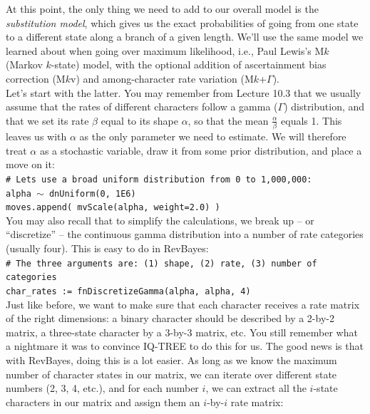 \documentclass[12pt]{article}
\begin{document}
\vspace*{1.8ex}

\noindent At this point, the only thing we need to add to our overall model is the \textit{substitution model}, which gives us the exact probabilities of going from one state to a different state along a branch of a given length. We'll use the same model we learned about when going over maximum likelihood, i.e., Paul Lewis's M$k$ (Markov $k$-state) model, with the optional addition of ascertainment bias correction (M$k$v) and among-character rate variation (M$k$+$\Gamma$). \\

\noindent Let's start with the latter. You may remember from Lecture 10.3 that we usually assume that the rates of different characters follow a gamma ($\Gamma$) distribution, and that we set its rate $\beta$ equal to its shape $\alpha$, so that the mean $\frac{\alpha}{\beta}$ equals 1. This leaves us with $\alpha$ as the only parameter we need to estimate. We will therefore treat $\alpha$ as a stochastic variable, draw it from some prior distribution, and place a move on it: \\

\indent \texttt{\# Let\textquotesingle s use a broad uniform distribution from 0 to 1,000,000:} \\
\indent \texttt{alpha {\footnotesize $\sim$} dnUniform(0, 1E6)} \\
\indent \texttt{moves.append( mvScale(alpha, weight=2.0) )} \\

\noindent You may also recall that to simplify the calculations, we break up -- or ``discretize'' -- the continuous gamma distribution into a number of rate categories (usually four). This is easy to do in RevBayes: \\

\indent \texttt{\# The three arguments are: (1) shape, (2) rate, (3) number of categories} \\
\indent \texttt{char\_rates := fnDiscretizeGamma(alpha, alpha, 4)} \\

\noindent Just like before, we want to make sure that each character receives a rate matrix of the right dimensions: a binary character should be described by a 2-by-2 matrix, a three-state character by a 3-by-3 matrix, etc. You still remember what a nightmare it was to convince IQ-TREE to do this for us. The good news is that with RevBayes, doing this is a lot easier. As long as we know the maximum number of character states in our matrix, we can iterate over different state numbers (2, 3, 4, etc.), and for each number $i$, we can extract all the $i$-state characters in our matrix and assign them an $i$-by-$i$ rate matrix: \\
\end{document}
